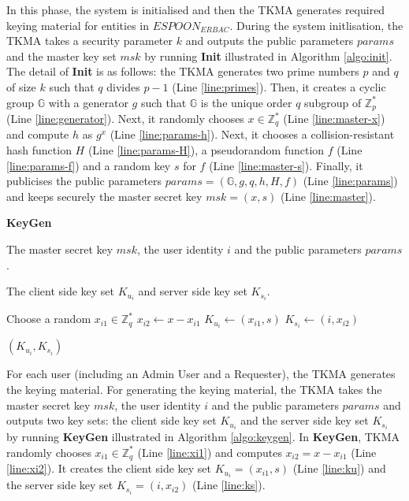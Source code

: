 \documentclass[final,5p,times,twocolumn]{elsarticle}
\newcommand{\algofontsize}{\fontsize{7}{8}\selectfont}
\begin{document}
In this phase, the system is initialised and then the TKMA generates required keying material for entities in $\mathit{ESPOON_{ERBAC}}$. During the system initlisation, the TKMA takes a security parameter $k$ and outputs the public parameters $params$ and the master key set $msk$ by running \textbf{Init} illustrated in Algorithm \ref{algo:init}. The detail of \textbf{Init} is as follows: the TKMA generates two prime numbers $p$ and $q$ of size $k$ such that $q$ divides $p-1$ (Line \ref{line:primes}). Then, it creates a cyclic group $\mathbb{G}$ with a generator $g$ such that $\mathbb{G}$ is the unique order $q$ subgroup of $\mathbb{Z}^*_p$ (Line \ref{line:generator}). Next, it randomly chooses $x \in \mathbb{Z}^*_q$ (Line \ref{line:master-x}) and compute $h$ as $g^x$ (Line \ref{line:params-h}). Next, it chooses a collision-resistant hash function $H$ (Line \ref{line:params-H}), a pseudorandom function $f$ (Line \ref{line:params-f}) and a random key $s$ for $f$ (Line \ref{line:master-s}). Finally, it publicises the public parameters $params = (\mathbb{G}, g, q, h, H, f)$ (Line \ref{line:params}) and keeps securely the master secret key $msk = (x, s)$ (Line \ref{line:master}).




\begin{algorithm}[htp]
{\algofontsize
\caption{\textbf{KeyGen}}

\label{algo:keygen}

\begin{algorithmic}[1]

\REQUIRE The master secret key $msk$, the user identity $i$ and the public parameters $params$.

\ENSURE The client side key set $K_{u_i}$ and server side key set $K_{s_i}$.

\medskip

\STATE Choose a random $x_{i1} \in \mathbb{Z}^*_q$ \label{line:xi1}
\STATE $x_{i2} \leftarrow x - x_{i1}$ \label{line:xi2}
\STATE $K_{u_i} \leftarrow (x_{i1}, s)$ \label{line:ku}
\STATE $K_{s_i} \leftarrow (i, x_{i2})$ \label{line:ks}

\RETURN $(K_{u_i}, K_{s_i})$

\end{algorithmic}
}
\end{algorithm}



For each user (including an Admin User and a Requester), the TKMA generates the keying material. For generating the keying material, the TKMA takes the master secret key $msk$, the user identity $i$ and the public parameters $params$ and outputs two key sets: the client side key set $K_{u_i}$ and the server side key set $K_{s_i}$ by running \textbf{KeyGen} illustrated in Algorithm \ref{algo:keygen}. In \textbf{KeyGen}, TKMA randomly chooses $x_{i1} \in \mathbb{Z}^*_q$ (Line \ref{line:xi1}) and computes $x_{i2} = x - x_{i1}$ (Line \ref{line:xi2}). It creates the client side key set $K_{u_i} = (x_{i1}, s)$ (Line \ref{line:ku}) and the server side key set $K_{s_i} = (i, x_{i2})$ (Line \ref{line:ks}).
\end{document}
